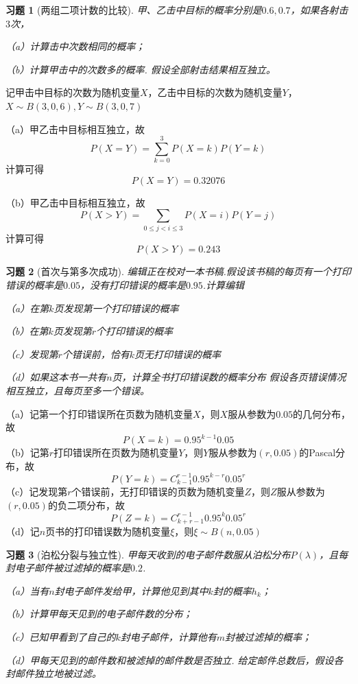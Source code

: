 \documentclass[UTF8,12pt,a4paper,fontset=fandol]{ctexart}
\newtheorem{exercise}{习题}[section]
\begin{document}
\begin{exercise}[两组二项计数的比较]\label{q:Y3.7}
甲、乙击中目标的概率分别是$0.6,0.7$，如果各射击$3$次，

（a）计算击中次数相同的概率；

（b）计算甲击中的次数多的概率. 假设全部射击结果相互独立。\par{}
\end{exercise}

\begin{solve}\label{a:Y3.7}
记甲击中目标的次数为随机变量$X$，乙击中目标的次数为随机变量$Y$，$X\sim B(3,0,6),Y\sim B(3,0,7)$

（a）甲乙击中目标相互独立，故
\[P(X = Y) = \sum\limits_{k = 0}^3 {P(X = k)P(Y = k)} \]
计算可得
\[P(X = Y) = 0.32076\]

（b）甲乙击中目标相互独立，故
\[P(X > Y) = \sum\limits_{0 \leqslant j < i \leqslant 3} {P(X = i)P(Y = j)} \]
计算可得
\[P(X > Y) = 0.243\]
\end{solve}

\begin{exercise}[首次与第多次成功]\label{q:Y3.8}
编辑正在校对一本书稿.假设该书稿的每页有一个打印错误的概率是$0.05$，没有打印错误的概率是$0.95$.计算编辑

（a）在第$k$页发现第一个打印错误的概率

（b）在第$k$页发现第$r$个打印错误的概率

（c）发现第$r$个错误前，恰有$k$页无打印错误的概率

（d）如果这本书一共有$n$页，计算全书打印错误数的概率分布 假设各页错误情况相互独立，且每页至多一个错误。\par{}
\end{exercise}

\begin{solve}\label{a:Y3.8}
（a）记第一个打印错误所在页数为随机变量$X$，则$X$服从参数为$0.05$的几何分布，故
\[P(X=k)=0.95^{k-1} 0.05\]
（b）记第$r$打印错误所在页数为随机变量$Y$，则$Y$服从参数为$(r,0.05)$的Pascal分布，故
\[P(Y = k) = C_{k - 1}^{r - 1}{0.95^{k - r}}{0.05^r}\]
（c）记发现第$r$个错误前，无打印错误的页数为随机变量$Z$，则$Z$服从参数为$(r,0.05)$的负二项分布，故 
\[P(Z = k) = C_{k + r - 1}^{r - 1}{0.95^k}{0.05^r}\]
（d）记$n$页书的打印错误数为随机变量$\xi$，则$\xi\sim B(n,0.05)$
\end{solve}

\begin{exercise}[泊松分裂与独立性]\label{q:Y3.9}
甲每天收到的电子邮件数服从泊松分布$P(\lambda)$，且每封电子邮件被过滤掉的概率是$0.2$.

（a）当有$n$封电子邮件发给甲，计算他见到其中$k$封的概率$h_k$；

（b）计算甲每天见到的电子邮件数的分布；

（c）已知甲看到了自己的$k$封电子邮件，计算他有$m$封被过滤掉的概率；

（d）甲每天见到的邮件数和被滤掉的邮件数是否独立. 给定邮件总数后，假设各封邮件独立地被过滤。\par{}
\end{exercise}
\end{document}
